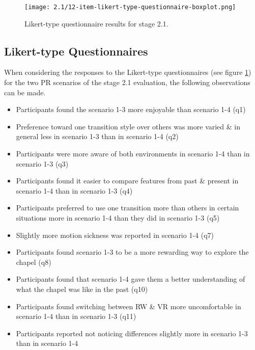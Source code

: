 
\begin{figure}[h]
	\begin{center}
	\texttt{[image: 2.1/12-item-likert-type-questionnaire-boxplot.png]}
	\caption{Likert-type questionnaire results for stage 2.1.}
	\label{2-1-12-item-likert-type-questionnaire-boxplot.png}
	\end{center}
\end{figure}


\subsection{Likert-type Questionnaires}

When considering the responses to the Likert-type questionnaires (see figure \ref{2-1-12-item-likert-type-questionnaire-boxplot.png}) for the two PR scenarios of the stage 2.1 evaluation, the following observations can be made.

\begin{itemize}
	\item Participants found the scenario 1-3 more enjoyable than scenario 1-4 (q1)
	\item Preference toward one transition style over others was more varied \& in general less in scenario 1-3 than in scenario 1-4 (q2)
	\item Participants were more aware of both environments in scenario 1-4 than in scenario 1-3 (q3)
	\item Participants found it easier to compare features from past \& present in scenario 1-4 than in scenario 1-3 (q4)
	\item Participants preferred to use one transition more than others in certain situations more in scenario 1-4 than they did in scenario 1-3 (q5)
	\item Slightly more motion sickness was reported in scenario 1-4 (q7)
	\item Participants found scenario 1-3 to be a more rewarding way to explore the chapel (q8)
	\item Participants found that scenario 1-4 gave them a better understanding of what the chapel was like in the past (q10)
	\item Participants found switching between RW \& VR more uncomfortable in scenario 1-4 than in scenario 1-3 (q11)
	\item Participants reported not noticing differences slightly more in scenario 1-3 than in scenario 1-4
\end{itemize}

